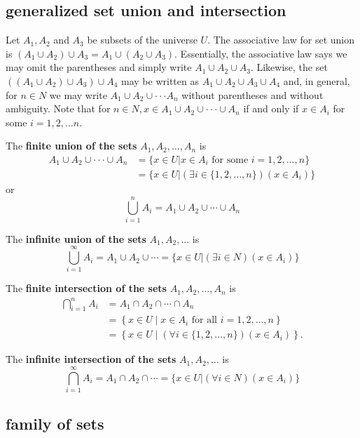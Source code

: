 \documentclass{article}
\begin{document}
    \subsection{generalized set union and intersection}

    Let $A_1, A_2$ and $A_3$ be subsets of the universe $U$. The associative law for set union is $(A_1 \cup A_2) \cup A_3 = A_1 \cup (A_2 \cup A_3)$. Essentially, the associative law says we may omit the parentheses and simply write $A_1 \cup A_2 \cup A_3$. Likewise, the set $((A_1 \cup A_2) \cup A_3) \cup A_4$ may be written as $A_1 \cup A_2 \cup A_3 \cup A_4$ and, in general, for $n \in N$ we may write $A_1 \cup A_2 \cup \cdot \cdot \cdot A_n$ without parentheses and without ambiguity. Note that for $n \in N, x \in A_1 \cup A_2 \cup \cdot \cdot \cdot \cup A_n$ if and only if $x \in A_i$ for some $i = 1,2,...n.$

    The \textbf{finite union of the sets} $A_1,A_2,...,A_n$ is
    $$
    \begin{aligned}
    A_1 \cup A_2 \cup \cdot \cdot \cdot \cup A_n & = \{x \in U | x \in A_i \textrm{ for some } i = 1,2,...,n\} \\
    & = \{x \in U | (\exists i \in \{1,2,...,n\})(x \in A_i)\}
    \end{aligned}
    $$
    or
    $$
    \bigcup_{i=1}^{n} A_{i}=A_{1} \cup A_{2} \cup \cdots \cup A_{n}
    $$

    The \textbf{infinite union of the sets} $A_1,A_2,...$ is 
    $$
    \bigcup_{i=1}^{\infty} A_i = A_1 \cup A_2 \cup \cdots = \{x \in U | (\exists i \in N)(x \in A_i)\}
    $$

    The \textbf{finite intersection of the sets} $A_1,A_2,\dots,A_n$ is
    $$
    \begin{aligned}
    \bigcap_{i=1}^{n} A_{i} &=A_{1} \cap A_{2} \cap \cdots \cap A_{n} \\
    &=\left\{x \in U \mid x \in A_{i} \text { for all } i=1,2, \ldots, n\right\} \\
    &=\left\{x \in U \mid(\forall i \in\{1,2, \ldots, n\})\left(x \in A_{i}\right)\right\} .
    \end{aligned}
    $$
    
    The \textbf{infinite intersection of the sets} $A_1,A_2,\dots$ is
    $$
    \bigcap_{i=1}^\infty A_i = A_1 \cap A_2 \cap \cdots = \{x \in U | (\forall i \in N)(x \in A_i)\}
    $$

    \subsection{family of sets}
\end{document}
